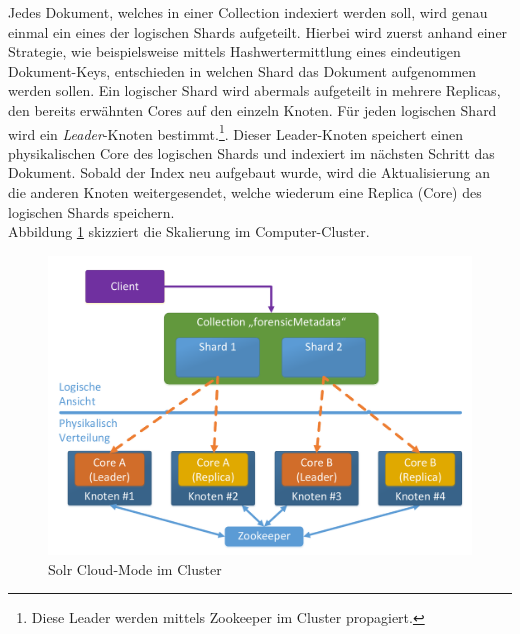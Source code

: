 \noindent
Jedes Dokument, welches in einer Collection indexiert werden soll, wird genau einmal ein eines der logischen Shards aufgeteilt. Hierbei wird zuerst anhand einer Strategie, wie beispielsweise mittels Hashwertermittlung eines eindeutigen Dokument-Keys, entschieden in welchen Shard das Dokument aufgenommen werden sollen. Ein logischer Shard wird abermals aufgeteilt in mehrere Replicas, den bereits erwähnten Cores auf den einzeln Knoten. Für jeden logischen Shard wird ein \textit{Leader}-Knoten bestimmt.\footnote{Diese Leader werden mittels Zookeeper im Cluster propagiert.}. Dieser Leader-Knoten speichert einen physikalischen Core des logischen Shards und indexiert im nächsten Schritt das Dokument. Sobald der Index neu aufgebaut wurde, wird die Aktualisierung an die anderen Knoten weitergesendet, welche wiederum eine Replica (Core) des logischen Shards speichern.\cite[S. 867 ff]{solr_ref_guide}\\ 
Abbildung \ref{fig:solr_cluster_architecture} skizziert die Skalierung im Computer-Cluster.\\

\begin{figure}[ht]
  \centering
  \includegraphics[width=\textwidth]{./resource/solr_cluster_architecture.pdf}
  \caption{Solr Cloud-Mode im Cluster}
  \label{fig:solr_cluster_architecture}
\end{figure}


